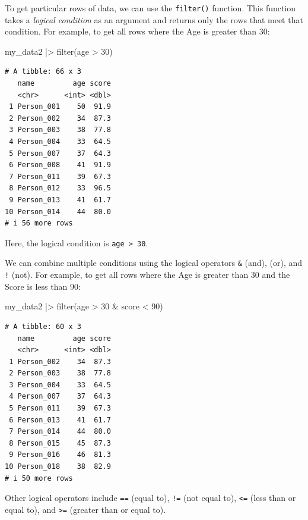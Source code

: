 \documentclass[
  letterpaper,
  8pt,
  a4paper]{book}
\newenvironment{Shaded}{\begin{snugshade}}{\end{snugshade}}
\newcommand{\DecValTok}[1]{\textcolor[rgb]{0.68,0.00,0.00}{#1}}
\newcommand{\FunctionTok}[1]{\textcolor[rgb]{0.28,0.35,0.67}{#1}}
\newcommand{\NormalTok}[1]{\textcolor[rgb]{0.00,0.23,0.31}{#1}}
\newcommand{\SpecialCharTok}[1]{\textcolor[rgb]{0.37,0.37,0.37}{#1}}
\begin{document}
To get particular rows of data, we can use the \texttt{filter()}
function. This function takes a \emph{logical condition} as an argument
and returns only the rows that meet that condition. For example, to get
all rows where the Age is greater than 30:

\begin{Shaded}
\begin{Highlighting}[]
\NormalTok{my\_data2 }\SpecialCharTok{|\textgreater{}} 
  \FunctionTok{filter}\NormalTok{(age }\SpecialCharTok{\textgreater{}} \DecValTok{30}\NormalTok{)}
\end{Highlighting}
\end{Shaded}

\begin{verbatim}
# A tibble: 66 x 3
   name         age score
   <chr>      <int> <dbl>
 1 Person_001    50  91.9
 2 Person_002    34  87.3
 3 Person_003    38  77.8
 4 Person_004    33  64.5
 5 Person_007    37  64.3
 6 Person_008    41  91.9
 7 Person_011    39  67.3
 8 Person_012    33  96.5
 9 Person_013    41  61.7
10 Person_014    44  80.0
# i 56 more rows
\end{verbatim}

Here, the logical condition is \texttt{age\ \textgreater{}\ 30}.

We can combine multiple conditions using the logical operators
\texttt{\&} (and), \texttt{\textbar{}} (or), and \texttt{!} (not). For
example, to get all rows where the Age is greater than 30 and the Score
is less than 90:

\begin{Shaded}
\begin{Highlighting}[]
\NormalTok{my\_data2 }\SpecialCharTok{|\textgreater{}} 
  \FunctionTok{filter}\NormalTok{(age }\SpecialCharTok{\textgreater{}} \DecValTok{30} \SpecialCharTok{\&}\NormalTok{ score }\SpecialCharTok{\textless{}} \DecValTok{90}\NormalTok{)}
\end{Highlighting}
\end{Shaded}

\begin{verbatim}
# A tibble: 60 x 3
   name         age score
   <chr>      <int> <dbl>
 1 Person_002    34  87.3
 2 Person_003    38  77.8
 3 Person_004    33  64.5
 4 Person_007    37  64.3
 5 Person_011    39  67.3
 6 Person_013    41  61.7
 7 Person_014    44  80.0
 8 Person_015    45  87.3
 9 Person_016    46  81.3
10 Person_018    38  82.9
# i 50 more rows
\end{verbatim}

Other logical operators include \texttt{==} (equal to), \texttt{!=} (not
equal to), \texttt{\textless{}=} (less than or equal to), and
\texttt{\textgreater{}=} (greater than or equal to).
\end{document}
